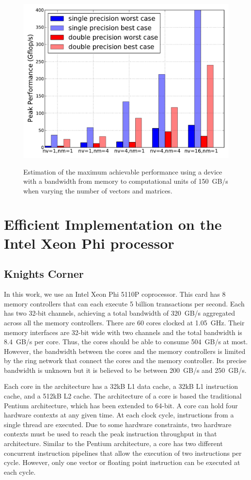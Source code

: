 \documentclass[10pt,conference,compsocconf]{IEEEtran}
\begin{document}
\begin{figure}
  \centering 
  \includegraphics[width=.9\linewidth]{figures/gflops_peak.pdf}\label{fig:gflops-peak-perf}
  \caption{Estimation of the maximum achievable performance using a
    device with a bandwidth from memory to computational units of 150~GB/s when
    varying the number of vectors and matrices.}
  \label{fig:perf_predict}
\end{figure}

\section{Efficient Implementation on the Intel Xeon Phi processor}
\label{sec:impl}

\subsection{Knights Corner}

In this work, we use an Intel Xeon Phi 5110P coprocessor. This card
has 8 memory controllers that can each execute 5 billion
transactions per second. Each has two 32-bit channels, achieving a total
bandwidth of 320~GB/s aggregated across all the memory
controllers. There are 60 cores clocked at 1.05~GHz. Their memory
interfaces are 32-bit wide with two channels and the total bandwidth
is 8.4~GB/s per core. Thus, the cores should be able to consume 504~GB/s
at most. However, the bandwidth between the cores and the memory
controllers is limited by the ring network that connect the cores and
the memory controller. Its precise bandwidth is unknown but it is
believed to be between 200~GB/s and 250~GB/s.

Each core in the architecture has a 32kB L1 data cache, a 32kB L1
instruction cache, and a 512kB L2 cache. The architecture of a core is
based the traditional Pentium architecture, which has been extended to
64-bit. A core can hold four hardware contexts at any given time. At each
clock cycle, instructions from a single thread are executed. Due to
some hardware constraints, two hardware contexts must be used to reach
the peak instruction throughput in that architecture. Similar to the
Pentium architecture, a core has two different concurrent instruction
pipelines that allow the execution of two instructions per
cycle. However, only one vector or floating point instruction can be
executed at each cycle.
\end{document}

